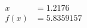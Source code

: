 \documentclass[preview]{standalone}
\begin{document}
\begin{align*}
x &= 1.2176\\f(x) &= 5.8359157
\end{align*}
\end{document}
